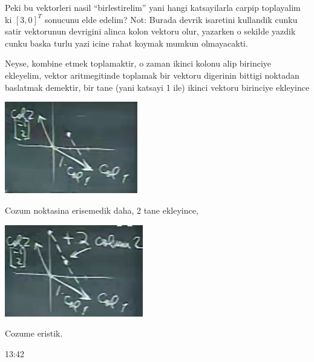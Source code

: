 \documentclass[12pt,fleqn]{article}\usepackage{../common}
\begin{document}
Peki bu vektorleri nasil ``birlestirelim'' yani hangi katsayilarla carpip
toplayalim ki $[3,0]^T$ sonucunu elde edelim? Not: Burada devrik isaretini
kullandik cunku satir vektorunun devrigini alinca kolon vektoru olur,
yazarken o sekilde yazdik cunku baska turlu yazi icine rahat koymak mumkun
olmayacakti. 

Neyse, kombine etmek toplamaktir, o zaman ikinci kolonu alip birinciye
ekleyelim, vektor aritmegitinde toplamak bir vektoru digerinin bittigi
noktadan baslatmak demektir, bir tane (yani katsayi 1 ile) ikinci vektoru
birinciye ekleyince

\includegraphics[height=4cm]{1_04.png}

Cozum noktasina erisemedik daha, 2 tane ekleyince,

\includegraphics[height=4cm]{1_05.png}

Cozume eristik. 

13:42
\end{document}
